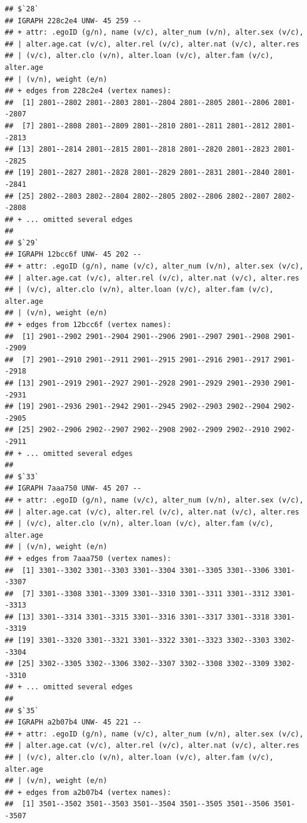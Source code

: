\documentclass[
]{book}
\begin{document}
\begin{verbatim}
## $`28`
## IGRAPH 228c2e4 UNW- 45 259 -- 
## + attr: .egoID (g/n), name (v/c), alter_num (v/n), alter.sex (v/c),
## | alter.age.cat (v/c), alter.rel (v/c), alter.nat (v/c), alter.res
## | (v/c), alter.clo (v/n), alter.loan (v/c), alter.fam (v/c), alter.age
## | (v/n), weight (e/n)
## + edges from 228c2e4 (vertex names):
##  [1] 2801--2802 2801--2803 2801--2804 2801--2805 2801--2806 2801--2807
##  [7] 2801--2808 2801--2809 2801--2810 2801--2811 2801--2812 2801--2813
## [13] 2801--2814 2801--2815 2801--2818 2801--2820 2801--2823 2801--2825
## [19] 2801--2827 2801--2828 2801--2829 2801--2831 2801--2840 2801--2841
## [25] 2802--2803 2802--2804 2802--2805 2802--2806 2802--2807 2802--2808
## + ... omitted several edges
## 
## $`29`
## IGRAPH 12bcc6f UNW- 45 202 -- 
## + attr: .egoID (g/n), name (v/c), alter_num (v/n), alter.sex (v/c),
## | alter.age.cat (v/c), alter.rel (v/c), alter.nat (v/c), alter.res
## | (v/c), alter.clo (v/n), alter.loan (v/c), alter.fam (v/c), alter.age
## | (v/n), weight (e/n)
## + edges from 12bcc6f (vertex names):
##  [1] 2901--2902 2901--2904 2901--2906 2901--2907 2901--2908 2901--2909
##  [7] 2901--2910 2901--2911 2901--2915 2901--2916 2901--2917 2901--2918
## [13] 2901--2919 2901--2927 2901--2928 2901--2929 2901--2930 2901--2931
## [19] 2901--2936 2901--2942 2901--2945 2902--2903 2902--2904 2902--2905
## [25] 2902--2906 2902--2907 2902--2908 2902--2909 2902--2910 2902--2911
## + ... omitted several edges
## 
## $`33`
## IGRAPH 7aaa750 UNW- 45 207 -- 
## + attr: .egoID (g/n), name (v/c), alter_num (v/n), alter.sex (v/c),
## | alter.age.cat (v/c), alter.rel (v/c), alter.nat (v/c), alter.res
## | (v/c), alter.clo (v/n), alter.loan (v/c), alter.fam (v/c), alter.age
## | (v/n), weight (e/n)
## + edges from 7aaa750 (vertex names):
##  [1] 3301--3302 3301--3303 3301--3304 3301--3305 3301--3306 3301--3307
##  [7] 3301--3308 3301--3309 3301--3310 3301--3311 3301--3312 3301--3313
## [13] 3301--3314 3301--3315 3301--3316 3301--3317 3301--3318 3301--3319
## [19] 3301--3320 3301--3321 3301--3322 3301--3323 3302--3303 3302--3304
## [25] 3302--3305 3302--3306 3302--3307 3302--3308 3302--3309 3302--3310
## + ... omitted several edges
## 
## $`35`
## IGRAPH a2b07b4 UNW- 45 221 -- 
## + attr: .egoID (g/n), name (v/c), alter_num (v/n), alter.sex (v/c),
## | alter.age.cat (v/c), alter.rel (v/c), alter.nat (v/c), alter.res
## | (v/c), alter.clo (v/n), alter.loan (v/c), alter.fam (v/c), alter.age
## | (v/n), weight (e/n)
## + edges from a2b07b4 (vertex names):
##  [1] 3501--3502 3501--3503 3501--3504 3501--3505 3501--3506 3501--3507

\end{verbatim}
\end{document}
